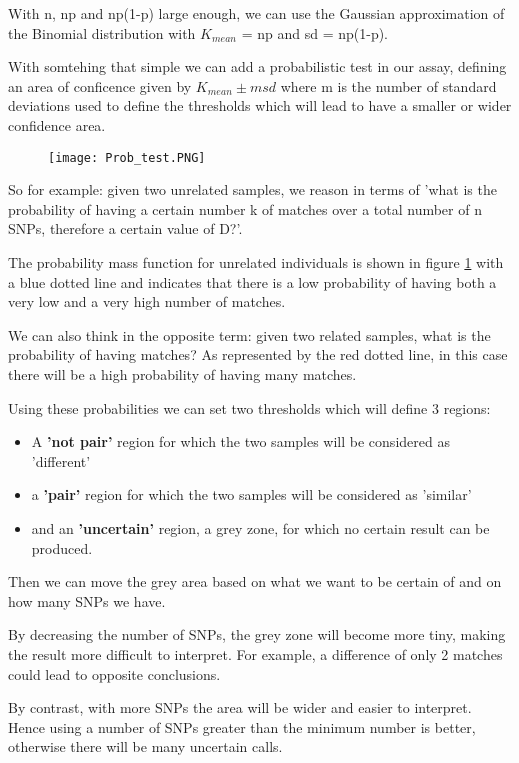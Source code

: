 With n, np and np(1-p) large enough, we can use the Gaussian approximation of the Binomial distribution with $K_{mean}$ = np and sd = np(1-p). 

With somtehing that simple we can add a probabilistic test in our assay, defining an area of conficence given by $K_{mean} \pm m  sd$ where m is the number of standard deviations used to define the thresholds which will lead to have a smaller or wider confidence area. 

\begin{figure}
	\centering
	\texttt{[image: Prob\_test.PNG]}
	\caption{\label{fig:prob_test}}
\end{figure}

\bigskip
So for example: given two unrelated samples, we reason in terms of 'what is the probability of having a certain number k of matches over a total number of n SNPs, therefore a certain value of D?'. 

The probability mass function for unrelated individuals is shown in figure \ref{fig:prob_test} with a blue dotted line and indicates that there is a low probability of having both a very low and a very high number of matches. 

We can also think in the opposite term: given two related samples, what is the probability of having  matches? As represented by the red dotted line, in this case there will be a high probability of having many matches. 

Using these probabilities we can set two thresholds which will define 3 regions:
\begin{itemize}
	\item A \textbf{'not pair'} region for which the two samples will be considered as 'different'
 	\item a \textbf{'pair'} region for which the two samples will be considered as 'similar'
	\item and an \textbf{'uncertain'} region, a grey zone, for which no certain result can be produced. 
\end{itemize}

Then we can move the grey area based on what we want to be certain of and on how many SNPs we have.

By decreasing the number of SNPs, the grey zone will become more tiny, making the result more difficult to interpret. For example, a difference of only 2 matches could lead to opposite conclusions. 

By contrast, with more SNPs the area will be wider and easier to interpret. Hence using a number of SNPs greater than the minimum number is better, otherwise there will be many uncertain calls. 


